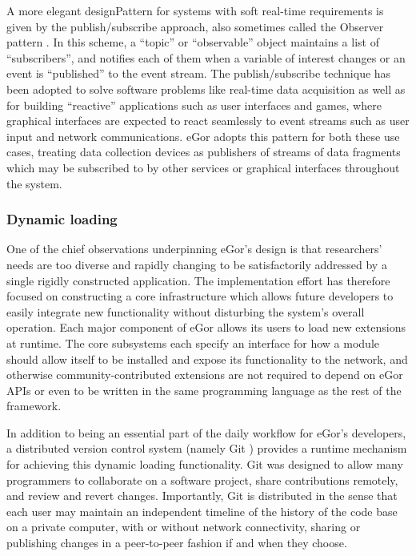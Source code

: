 \documentclass[../thesis]{subfiles}
\begin{document}
A more elegant \gls{designPattern} for systems with soft real-time
requirements is given by the publish/subscribe approach, also
sometimes called the Observer pattern \cite{GangOfFour}. In this
scheme, a ``topic'' or ``observable'' object maintains a list of
``subscribers'', and notifies each of them when a variable of interest
changes or an event is ``published'' to the event stream. The
publish/subscribe technique has been adopted to solve software
problems like real-time data acquisition as well as for building
``reactive'' applications such as user interfaces and games, where
graphical interfaces are expected to react seamlessly to event streams
such as user input and network communications. eGor adopts this
pattern for both these use cases, treating data collection devices as
publishers of streams of data fragments which may be subscribed to by
other services or graphical interfaces throughout the system.

\subsubsection{Dynamic loading}
One of the chief observations underpinning eGor's design is that
researchers' needs are too diverse and rapidly changing to be
satisfactorily addressed by a single rigidly constructed
application. The implementation effort has therefore focused on
constructing a core infrastructure which allows future developers to
easily integrate new functionality without disturbing the system's
overall operation. Each major component of eGor allows its users to
load new extensions at runtime. The core subsystems each specify an
interface for how a module should allow itself to be installed and
expose its functionality to the network, and otherwise
community-contributed extensions are not required to depend on eGor
APIs or even to be written in the same programming language as the
rest of the framework.

In addition to being an essential part of the daily workflow for
eGor's developers, a distributed version control system (namely Git
\cite{Git}) provides a runtime mechanism for achieving this dynamic
loading functionality. Git was designed to allow many programmers to
collaborate on a software project, share contributions remotely, and
review and revert changes. Importantly, Git is distributed in the
sense that each user may maintain an independent timeline of the
history of the code base on a private computer, with or without
network connectivity, sharing or publishing changes in a peer-to-peer
fashion if and when they choose.
\end{document}
